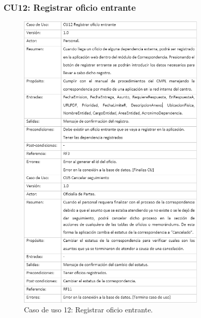 		\subsubsection{CU12: Registrar oficio entrante}
	\begin{figure}[htbp!]
		\centering
			\includegraphics[width=0.8\textwidth]{images/CU/CU12}
		\caption{Caso de uso 12: Registrar oficio entrante.}
		\label{Tabla}
	\end{figure}
	
